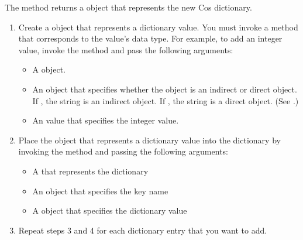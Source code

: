 \documentclass[letterpaper,12pt,english,openany,oneside]{sphinxmanual}
\begin{document}
The  method returns a  object that represents the new Cos dictionary.
\begin{enumerate}
%
\setcounter{enumi}{2}
\item {} 
Create a  object that represents a dictionary value. You must invoke a method that corresponds to the value’s data type. For example, to add an integer value, invoke the  method and pass the following arguments:
\begin{itemize}
\item {} 
A  object.

\item {} 
An  object that specifies whether the  object is an indirect or direct object. If , the string is an indirect object. If , the string is a direct object. (See .)

\item {} 
An  value that specifies the integer value.

\end{itemize}

\item {} 
Place the  object that represents a dictionary value into the dictionary by invoking the  method and passing the following arguments:
\begin{itemize}
\item {} 
A  that represents the dictionary

\item {} 
An  object that specifies the key name

\item {} 
A  object that specifies the dictionary value

\end{itemize}

\item {} 
Repeat steps 3 and 4 for each dictionary entry that you want to add.

\end{enumerate}
\end{document}
